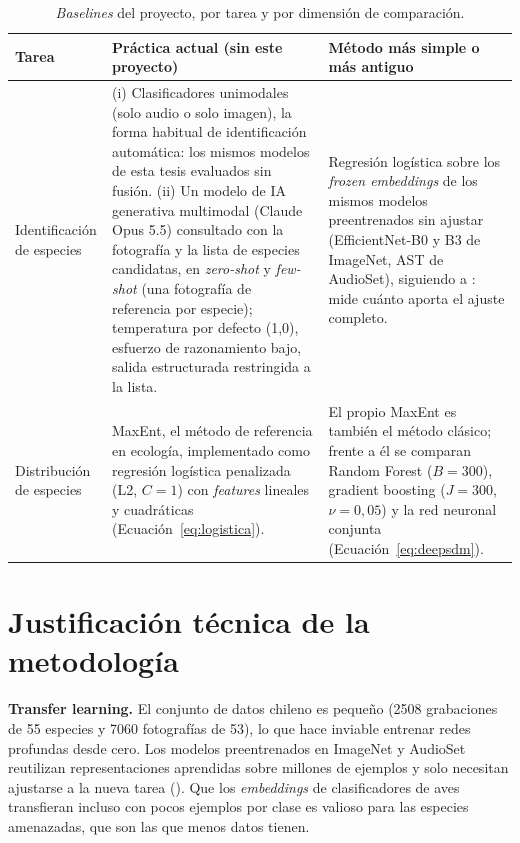 \begin{table}[!htb]
  \centering\footnotesize
  \caption{\textit{Baselines} del proyecto, por tarea y por dimensión de
  comparación.}
  \label{tab:baselines-def}
  \begin{tabularx}{\textwidth}{@{}>{\raggedright\arraybackslash\hsize=0.55\hsize}X >{\raggedright\arraybackslash\hsize=1.25\hsize}X >{\raggedright\arraybackslash\hsize=1.2\hsize}X@{}}
    \toprule
    Tarea & Práctica actual (sin este proyecto) & Método más simple o más antiguo \\
    \midrule
    Identificación de especies &
    (i) Clasificadores unimodales (solo audio o solo imagen), la forma
    habitual de identificación automática: los mismos modelos de esta tesis
    evaluados sin fusión.
    (ii) Un modelo de IA generativa multimodal (Claude Opus 5.5) consultado
    con la fotografía y la lista de especies candidatas, en
    \textit{zero-shot} y \textit{few-shot} (una fotografía de referencia por
    especie); temperatura por defecto (1,0), esfuerzo de razonamiento bajo,
    salida estructurada restringida a la lista. &
    Regresión logística sobre los \textit{frozen embeddings} de los mismos
    modelos preentrenados sin ajustar (EfficientNet-B0 y B3 de ImageNet,
    AST de AudioSet), siguiendo a \citet{ghani2023embeddings}: mide cuánto
    aporta el ajuste completo. \\
    \midrule
    Distribución de especies &
    MaxEnt, el método de referencia en ecología, implementado como regresión
    logística penalizada (L2, $C = 1$) con \textit{features} lineales y
    cuadráticas (Ecuación~\ref{eq:logistica}). &
    El propio MaxEnt es también el método clásico; frente a él se comparan
    Random Forest ($B = 300$), gradient boosting ($J = 300$, $\nu = 0{,}05$)
    y la red neuronal conjunta (Ecuación~\ref{eq:deepsdm}). \\
    \bottomrule
  \end{tabularx}
\end{table}

\section{Justificación técnica de la metodología}\label{sec:justificacion}

\textbf{Transfer learning.} El conjunto de datos chileno es pequeño
(\num{2508} grabaciones de 55 especies y \num{7060} fotografías de 53), lo que
hace inviable entrenar redes profundas desde cero. Los modelos preentrenados
en ImageNet y AudioSet reutilizan representaciones aprendidas sobre millones
de ejemplos y solo necesitan ajustarse a la nueva tarea
(). Que los \textit{embeddings} de clasificadores
de aves transfieran incluso con pocos ejemplos por clase
\citep{ghani2023embeddings} es valioso para las especies amenazadas, que son
las que menos datos tienen.

